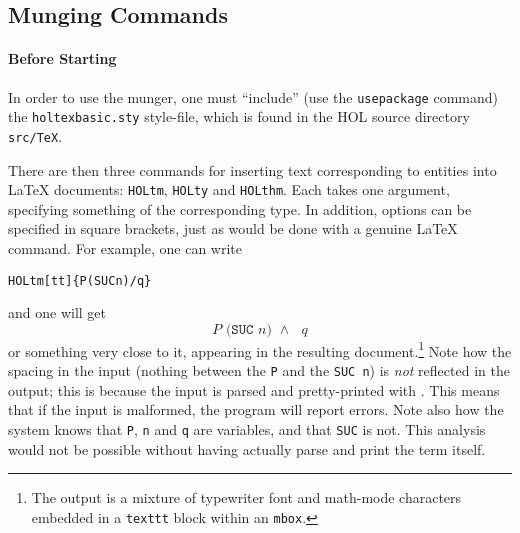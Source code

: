 \subsection{Munging Commands}
\label{sec:munging-commands}
\newcommand{\holtm}{\texttt{\bs{}HOLtm}}
\newcommand{\holty}{\texttt{\bs{}HOLty}}
\newcommand{\holthm}{\texttt{\bs{}HOLthm}}
\paragraph{Before Starting} In order to use the munger, one must ``include'' (use the \texttt{\bs{}usepackage} command) the \texttt{holtexbasic.sty} style-file, which is found in the HOL source directory \texttt{src/TeX}.

\bigskip
There are then three commands for inserting text corresponding to \HOL{} entities into \LaTeX{} documents: \holtm, \holty{} and \holthm.
%
Each takes one argument, specifying something of the corresponding \HOL{} type.
%
In addition, options can be specified in square brackets, just as would be done with a genuine \LaTeX{} command.
%
For example, one can write
\begin{alltt}
   \holtm{}[tt]\{P(SUC n) /\bs{} q\}
\end{alltt}
and one will get \[
  \texttt{$P$ (SUC $n$) $\land$ $q$}
\]
or something very close to it, appearing in the resulting document.\footnote{The output is a mixture of typewriter font and math-mode characters embedded in a \texttt{\bs{}texttt} block within an \texttt{\bs{}mbox}.}
%
Note how the spacing in the input (nothing between the \texttt{P} and the \texttt{SUC n}) is \emph{not} reflected in the output; this is because the input is parsed and pretty-printed with \HOL{}.
%
This means that if the \HOL{} input is malformed, the \munge{} program will report errors.
%
Note also how the system knows that \texttt{P}, \texttt{n} and \texttt{q} are variables, and that \texttt{SUC} is not.
%
This analysis would not be possible without having \HOL{} actually parse and print the term itself.

